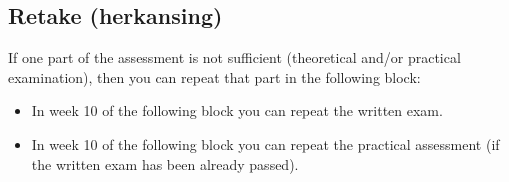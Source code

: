 	\subsection{Retake (herkansing)}
	If one part of the assessment is not sufficient (theoretical and/or practical examination), then you can repeat that part in the following block:
	\begin{itemize}
	\item In week 10 of the following block you can repeat the written exam.
	\item In week 10 of the following block you can repeat the practical assessment (if the written exam has been already passed).
	\end{itemize}
	
